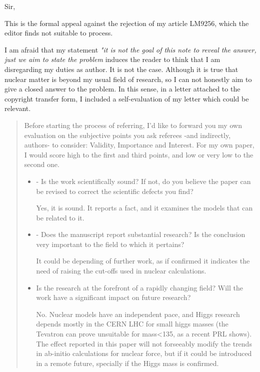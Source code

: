 \documentclass{letter}
\begin{document}
Sir,

This is the formal appeal against the rejection of my article
 LM9256, which the editor finds not suitable to process.

I am afraid that my statement {\it "it is not the goal of this note
to reveal the answer, just we aim to state the problem} induces the
reader to think that I am disregarding my duties as author. It
is not the case. Although it is true that nuclear matter is beyond
my usual field of research, so I can not honestly aim to give a closed
answer to the problem. In this sense,
in a letter attached to the copyright transfer form, I included
a self-evaluation of my letter which could be relevant.

\begin{quote}
Before starting the process of referring, I'd like to forward you
my own evaluation on the subjective points you ask referees -and
indirectly, authors- to consider: Validity, Importance and Interest. For
my own paper, I would score high to the first and third points, and low
or very low to the second one.

\begin{itemize}

\item - Is the work scientifically sound?  If not, do you believe the paper
 can be revised to correct the scientific defects you find?

Yes, it is sound. It reports a fact, and it examines the models that
can be related to it.

\item -  Does the manuscript report substantial research?  Is the conclusion
   very important to the field to which it pertains?

It could be depending of further work, as if confirmed it indicates the need
of raising the cut-offs used in nuclear calculations.

\item  Is the research
   at the forefront of a rapidly changing field?  Will the work have a
   significant impact on future research?

No. Nuclear models have an independent pace, and Higgs research depends
mostly in the CERN LHC for small higgs masses (the Tevatron can prove
unsuitable for mass<135, as a recent PRL shows). The effect reported in this
paper will not forseeably modify the trends in ab-initio calculations
for nuclear force, but if it could be introduced in a remote future, specially
if the Higgs mass is confirmed.


\end{itemize}
\end{quote}
\end{document}
